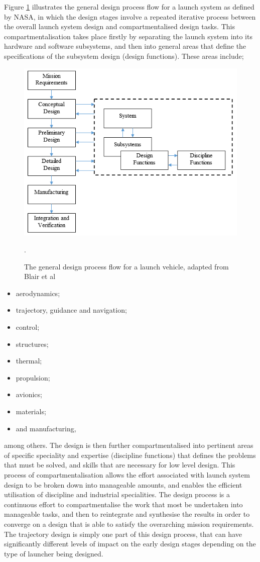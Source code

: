      Figure \ref{fig:DesignFlow} illustrates the general design process flow for a launch system as defined by NASA\cite{Blair2001}, in which the design stages involve a repeated iterative process between the overall launch system design and compartmentalised design tasks. This compartmentalisation takes place firstly by separating the
    launch system into its hardware and software subsystems, and then into general areas that define the specifications of the subsystem design (design functions). These areas include;
    \begin{figure}[ht]
    	\centering
    	\includegraphics[width=0.7\linewidth]{figures/2_literature-review/DesignFlow}
    	\caption{The general design process flow for a launch vehicle, adapted from Blair et al\cite{Blair2001}}.
    	\label{fig:DesignFlow}
    \end{figure}
    \begin{itemize}
    	\setlength\itemsep{.2em}
    	\item aerodynamics;
    	\item trajectory, guidance and navigation;
    	\item control;
    	\item structures;
    	\item thermal;
    	\item propulsion;
    	\item avionics;
    	\item materials;
    	\item and manufacturing,
    \end{itemize}
    among others\cite{Blair2001}. The design is then further compartmentalised into pertinent areas of specific speciality and expertise (discipline functions) that defines the problems that must be solved, and skills that are necessary for low level design. This process of compartmentalisation allows the effort associated with launch system design to be broken down into manageable amounts, and enables the efficient utilisation of discipline and industrial specialities. The design process is a continuous effort to compartmentalise the work that most be undertaken into manageable tasks, and then to reintegrate and synthesise the results in order to converge on a design that is able to satisfy the overarching mission requirements\cite{Blair2001}. The trajectory design is simply one part of this design process, that can have significantly different levels of impact on the early design stages depending on the type of launcher being designed. 
    
